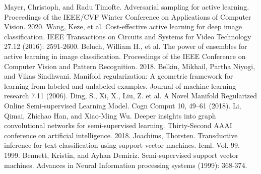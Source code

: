 \documentclass[runningheads]{llncs}
\begin{document}
\begin{thebibliography}{8}
    Mayer, Christoph, and Radu Timofte. Adversarial sampling for active learning. Proceedings of the IEEE/CVF Winter Conference on Applications of Computer Vision. 2020.
    Wang, Keze, et al. Cost-effective active learning for deep image classification. IEEE Transactions on Circuits and Systems for Video Technology 27.12 (2016): 2591-2600.
    Beluch, William H., et al. The power of ensembles for active learning in image classification. Proceedings of the IEEE Conference on Computer Vision and Pattern Recognition. 2018.
    Belkin, Mikhail, Partha Niyogi, and Vikas Sindhwani. Manifold regularization: A geometric framework for learning from labeled and unlabeled examples. Journal of machine learning research 7.11 (2006).
    Ding, S., Xi, X., Liu, Z. et al. A Novel Manifold Regularized Online Semi-supervised Learning Model. Cogn Comput 10, 49–61 (2018).
    Li, Qimai, Zhichao Han, and Xiao-Ming Wu. Deeper insights into graph convolutional networks for semi-supervised learning. Thirty-Second AAAI conference on artificial intelligence. 2018.
    Joachims, Thorsten. Transductive inference for text classification using support vector machines. Icml. Vol. 99. 1999.
    Bennett, Kristin, and Ayhan Demiriz. Semi-supervised support vector machines. Advances in Neural Information processing systems (1999): 368-374.
\end{thebibliography}
\end{document}
